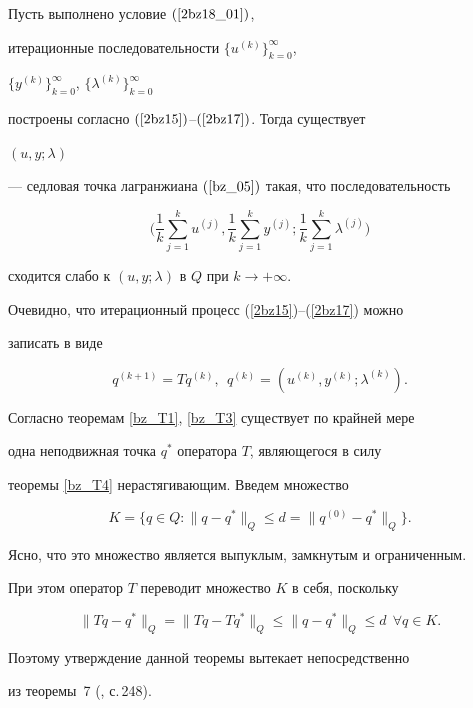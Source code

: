\begin{thm} \label{bz_T5}


Пусть выполнено условие $(\ref{2bz18_01})$,


итерационные последовательности $\{{u^{(k)}} \}_{k=0}^{\infty}$, 


$\{{y^{(k)}} \}_{k=0}^{\infty}$, $\{{\lambda^{(k)}} \}_{k=0}^{\infty}$


построены согласно $(\ref{2bz15})$--$(\ref{2bz17})$. Тогда существует 


$(u, y; \lambda)$


--- седловая точка лагранжиана $(\ref{bz_05})$ такая, что последовательность


$$


\bigg({\frac {1} {k} \sum \limits_{j=1}^{k} u^{(j)}, 


\frac {1} {k} \sum \limits_{j=1}^{k} y^{(j)}; 


\frac {1} {k} \sum \limits_{j=1}^{k} \lambda^{(j)} 


}\bigg)




$$


сходится слабо к $(u, y; \lambda)$ в $Q$ при $k \to+\infty$.


\end{thm}





\begin{pf}


Очевидно, что итерационный процесс (\ref{2bz15})--(\ref{2bz17}) можно


записать в виде


$$


q^{(k+1)}=Tq^{(k)},\ \ q^{(k)}=(u^{(k)}, y^{(k)}; \lambda^{(k)}).


$$





Согласно теоремам \ref{bz_T1}, \ref{bz_T3} существует по крайней мере


одна неподвижная точка $q^*$ оператора $T$, являющегося в силу


теоремы \ref{bz_T4} нерастягивающим. Введем множество


$$


K=\{{q \in Q: \| {q-q^*} \|_Q \leq d=


\| {q^{(0)}-q^*} \|_Q} \}. 


$$


Ясно, что это множество является выпуклым, замкнутым и ограниченным.


При этом оператор $T$ переводит множество $K$ в себя, поскольку


$$


\| {Tq-q^*} \|_Q=\| {Tq-Tq^*} \|_Q \leq


\| {q-q^*} \|_Q \leq d \ \ \forall q \in K.


$$


Поэтому утверждение данной теоремы вытекает непосредственно


из теоремы~7 (\cite{OE_88}, с.\,248).


\end{pf}





